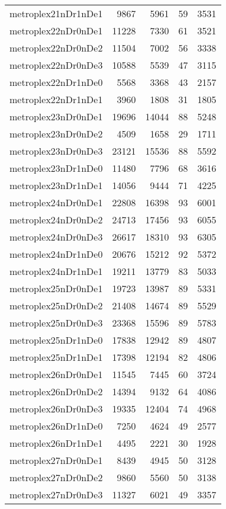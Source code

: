 \begin{tabular}{lrrrr}
metroplex21nDr1nDe1 & 9867 & 5961 & 59 & 3531 \\
metroplex22nDr0nDe1 & 11228 & 7330 & 61 & 3521 \\
metroplex22nDr0nDe2 & 11504 & 7002 & 56 & 3338 \\
metroplex22nDr0nDe3 & 10588 & 5539 & 47 & 3115 \\
metroplex22nDr1nDe0 & 5568 & 3368 & 43 & 2157 \\
metroplex22nDr1nDe1 & 3960 & 1808 & 31 & 1805 \\
metroplex23nDr0nDe1 & 19696 & 14044 & 88 & 5248 \\
metroplex23nDr0nDe2 & 4509 & 1658 & 29 & 1711 \\
metroplex23nDr0nDe3 & 23121 & 15536 & 88 & 5592 \\
metroplex23nDr1nDe0 & 11480 & 7796 & 68 & 3616 \\
metroplex23nDr1nDe1 & 14056 & 9444 & 71 & 4225 \\
metroplex24nDr0nDe1 & 22808 & 16398 & 93 & 6001 \\
metroplex24nDr0nDe2 & 24713 & 17456 & 93 & 6055 \\
metroplex24nDr0nDe3 & 26617 & 18310 & 93 & 6305 \\
metroplex24nDr1nDe0 & 20676 & 15212 & 92 & 5372 \\
metroplex24nDr1nDe1 & 19211 & 13779 & 83 & 5033 \\
metroplex25nDr0nDe1 & 19723 & 13987 & 89 & 5331 \\
metroplex25nDr0nDe2 & 21408 & 14674 & 89 & 5529 \\
metroplex25nDr0nDe3 & 23368 & 15596 & 89 & 5783 \\
metroplex25nDr1nDe0 & 17838 & 12942 & 89 & 4807 \\
metroplex25nDr1nDe1 & 17398 & 12194 & 82 & 4806 \\
metroplex26nDr0nDe1 & 11545 & 7445 & 60 & 3724 \\
metroplex26nDr0nDe2 & 14394 & 9132 & 64 & 4086 \\
metroplex26nDr0nDe3 & 19335 & 12404 & 74 & 4968 \\
metroplex26nDr1nDe0 & 7250 & 4624 & 49 & 2577 \\
metroplex26nDr1nDe1 & 4495 & 2221 & 30 & 1928 \\
metroplex27nDr0nDe1 & 8439 & 4945 & 50 & 3128 \\
metroplex27nDr0nDe2 & 9860 & 5560 & 50 & 3138 \\
metroplex27nDr0nDe3 & 11327 & 6021 & 49 & 3357 \\

\end{tabular}

